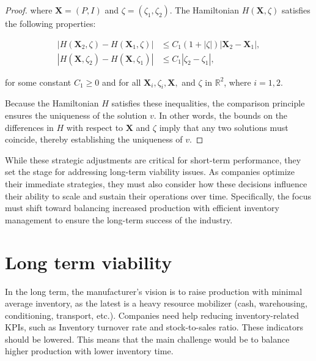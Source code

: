 \documentclass[]{interact}
\theoremstyle{plain}%
\theoremstyle{definition}
\theoremstyle{remark}
\begin{document}
\begin{proof}
where $  \mathbf{X}=(P, I) $ and $\zeta= (\zeta_1, \zeta_2)$. The Hamiltonian \( H(\mathbf{X}, \zeta) \) satisfies the following properties:

\[
\begin{aligned}
\left| H\left(\mathbf{X}_2, \zeta\right) - H\left(\mathbf{X}_1, \zeta\right) \right| &\leq C_1(1 + |\zeta|) \left| \mathbf{X}_2 - \mathbf{X}_1 \right|, \\
\left| H\left(\mathbf{X}, \zeta_2\right) - H\left(\mathbf{X}, \zeta_1\right) \right| &\leq C_1 \left| \zeta_2 - \zeta_1 \right|,
\end{aligned}
\]

for some constant \( C_1 \geq 0 \) and for all \( \mathbf{X}_i, \zeta_i, \mathbf{X}, \) and \(\zeta\) in \(\mathbb{R}^2\), where $i=1,2$.

Because the Hamiltonian \( H \) satisfies these inequalities, the comparison principle ensures the uniqueness of the solution \( v \). In other words, the bounds on the differences in \( H \) with respect to \( \mathbf{X} \) and \(\zeta\) imply that any two solutions must coincide, thereby establishing the uniqueness of \( v \).

\end{proof}


While these strategic adjustments are critical for short-term performance, they set the stage for addressing long-term viability issues. As companies optimize their immediate strategies, they must also consider how these decisions influence their ability to scale and sustain their operations over time. Specifically, the focus must shift toward balancing increased production with efficient inventory management to ensure the long-term success of the industry.




\section{Long term viability}



In the long term, the manufacturer's vision is to raise production with minimal average inventory, as the latest is a heavy resource mobilizer (cash, warehousing, conditioning, transport, etc.). Companies need help reducing inventory-related KPIs, such as Inventory turnover rate and stock-to-sales ratio. These indicators should be lowered. This means that the main challenge would be to balance higher production with lower inventory time.\\
\end{document}
